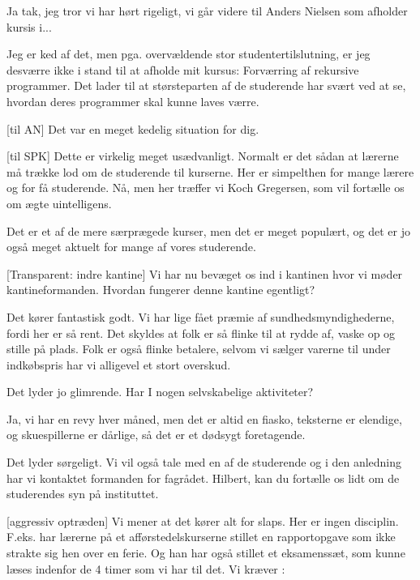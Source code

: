 \documentclass[a4paper,11pt]{article}
\begin{document}
\begin{sketch}
   Ja tak, jeg tror vi har hørt rigeligt, vi går videre til
  Anders Nielsen som afholder kursis i... 

   Jeg er ked af det, men pga. overvældende stor
  studentertilslutning, er jeg desværre ikke i stand til at afholde
  mit kursus: Forværring af rekursive programmer.  Det lader til at
  størsteparten af de studerende har svært ved at se, hvordan deres
  programmer skal kunne laves værre.

  [til AN] Det var en meget kedelig situation for dig.

  [til SPK] Dette er virkelig meget usædvanligt.  Normalt er
  det sådan at lærerne må trække lod om de studerende til kurserne.
  Her er simpelthen for mange lærere og for få studerende.  Nå, men
  her træffer vi Koch Gregersen, som vil fortælle os om ægte
  uintelligens.


   Det er et af de mere særprægede kurser, men det er meget
  populært, og det er jo også meget aktuelt for mange af vores
  studerende.

  [Transparent: indre kantine] Vi har nu bevæget os ind i
  kantinen hvor vi møder kantineformanden.  Hvordan fungerer denne
  kantine egentligt?

   Det kører fantastisk godt.  Vi har lige fået præmie af
  sundhedsmyndighederne, fordi her er så rent.  Det skyldes at folk er
  så flinke til at rydde af, vaske op og stille på plads.  Folk er
  også flinke betalere, selvom vi sælger varerne til under indkøbspris
  har vi alligevel et stort overskud.

   Det lyder jo glimrende.  Har I nogen selvskabelige aktiviteter?

   Ja, vi har en revy hver måned, men det er altid en fiasko,
  teksterne er elendige, og skuespillerne er dårlige, så det er et
  dødsygt foretagende.

   Det lyder sørgeligt.  Vi vil også tale med en af de
  studerende og i den anledning har vi kontaktet formanden for
  fagrådet.  Hilbert, kan du fortælle os lidt om de studerendes syn på
  instituttet.


  [aggressiv optræden] Vi mener at det kører alt for slaps.
  Her er ingen disciplin.  F.eks. har lærerne på et
  afførstedelskurserne stillet en rapportopgave som ikke strakte sig
  hen over en ferie.  Og han har også stillet et eksamenssæt, som
  kunne læses indenfor de 4 timer som vi har til det.  Vi kræver
  :


\end{sketch}
\end{document}
